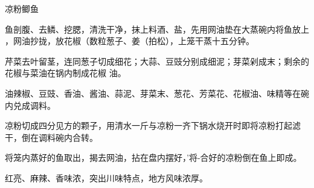 \begin{recipe}{凉粉鲫鱼}

\ingredients


\preparation

\step 鱼剖腹、去鳞、挖腮，清洗干净，抹上料酒、盐，先用网油垫在大蒸碗内将鱼放上
，网油抄拢，放花椒（数粒葱子、姜（拍松），上笼干蒸十五分钟。

\step 芹菜去叶留茎，连同葱子切成细花；大蒜、豆豉分别成细泥；芽菜剁成末；剩余的
花椒与菜油在锅内制成花椒 油。

\step 油辣椒、豆豉、香油、酱油、蒜泥、芽菜末、葱花、芳菜花、花椒油、味精等在碗
内兑成调料。

\step 凉粉切成四分见方的颗子，用清水一斤与凉粉一齐下锅水烧开时即将凉粉打起滤
干，倒在调料碗内合转。

\step 将笼内蒸好的鱼取出，揭去网油，拈在盘内摆好，’将-合好的凉粉倒在鱼上即成。

\features

红亮、麻辣、香味浓，突出川味特点，地方风味浓厚。

\end{recipe}

